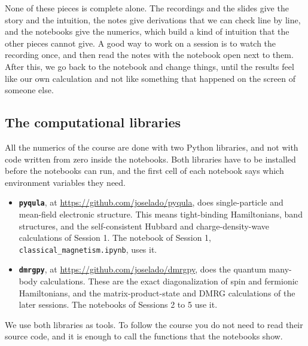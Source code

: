 \documentclass[11pt]{article}
\begin{document}
None of these pieces is complete alone. The recordings and the slides give the story and the
intuition, the notes give derivations that we can check line by line, and the notebooks give the
numerics, which build a kind of intuition that the other pieces cannot give. A good way to work on
a session is to watch the recording once, and then read the notes with the notebook open next to
them. After this, we go back to the notebook and change things, until the results feel like our own
calculation and not like something that happened on the screen of someone else.

\subsection*{The computational libraries}

All the numerics of the course are done with two Python libraries, and not with code written from
zero inside the notebooks. Both libraries have to be installed before the notebooks can run, and
the first cell of each notebook says which environment variables they need.

\begin{itemize}[nosep]
  \item \textbf{\texttt{pyqula}}, at \url{https://github.com/joselado/pyqula}, does single-particle
    and mean-field electronic structure. This means tight-binding Hamiltonians, band structures,
    and the self-consistent Hubbard and charge-density-wave calculations of Session 1. The notebook
    of Session 1, \texttt{classical\_magnetism.ipynb}, uses it.
  \item \textbf{\texttt{dmrgpy}}, at \url{https://github.com/joselado/dmrgpy}, does the quantum
    many-body calculations. These are the exact diagonalization of spin and fermionic Hamiltonians,
    and the matrix-product-state and DMRG calculations of the later sessions. The notebooks of
    Sessions 2 to 5 use it.
\end{itemize}

We use both libraries as tools. To follow the course you do not need to read their source code,
and it is enough to call the functions that the notebooks show.

\clearpage
\tableofcontents
\clearpage



\clearpage



\clearpage



\clearpage



\clearpage


\end{document}
